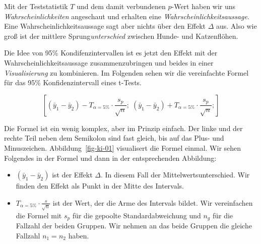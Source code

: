 \documentclass[
  letterpaper,
]{scrbook}
\providecommand{\tightlist}{%
  \setlength{\itemsep}{0pt}\setlength{\parskip}{0pt}}\usepackage{longtable,booktabs,array}
\begin{document}
{}

Mit der Teststatistik \(T\) und dem damit verbundenen \(p\)-Wert haben
wir uns \emph{Wahrscheinlichkeiten} angeschaut und erhalten eine
\emph{Wahrscheinlichkeitsaussage}. Eine Wahrscheinlichkeitsaussage sagt
aber nichts über den Effekt \(\Delta\) aus. Also wie groß ist der
mittlere Sprung\emph{unterschied} zwischen Hunde- und Katzenflöhen.

Die Idee von 95\% Kondifenzintervallen ist es jetzt den Effekt mit der
Wahrscheinlichkeitsaussage zusammenzubringen und beides in einer
\emph{Visualisierung} zu kombinieren. Im Folgenden sehen wir die
vereinfachte Formel für das 95\% Konfidenzintervall eines t-Tests.

\[
\left[
(\bar{y}_1-\bar{y}_2) - 
T_{\alpha = 5\%} \cdot \frac {s_p}{\sqrt{n}}; \;
(\bar{y}_1-\bar{y}_2) + 
T_{\alpha = 5\%} \cdot \frac {s_p}{\sqrt{n}};
\right]
\]

Die Formel ist ein wenig komplex, aber im Prinzip einfach. Der linke und
der rechte Teil neben dem Semikolon sind fast gleich, bis auf das Plus-
und Minuszeichen. Abbildung~\ref{fig-ki-01} visualisert die Formel
einmal. Wir sehen Folgendes in der Formel und dann in der entsprechenden
Abbildung:

\begin{itemize}
\tightlist
\item
  \((\bar{y}_{1}-\bar{y}_{2})\) ist der Effekt \(\Delta\). In diesem
  Fall der Mittelwertsunterschied. Wir finden den Effekt als Punkt in
  der Mitte des Intervals.
\item
  \(T_{\alpha = 5\%} \cdot \frac {s}{\sqrt{n}}\) ist der Wert, der die
  Arme des Intervals bildet. Wir vereinfachen die Formel mit \(s_p\) für
  die gepoolte Standardabweichung und \(n_g\) für die Fallzahl der
  beiden Gruppen. Wir nehmen an das beide Gruppen die gleiche Fallzahl
  \(n_1 = n_2\) haben.
\end{itemize}
\end{document}
